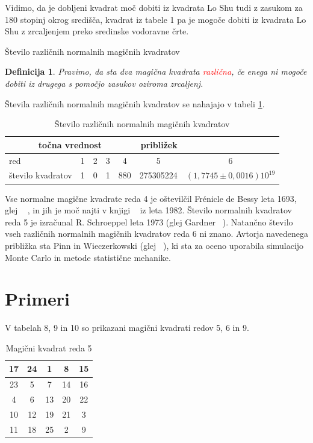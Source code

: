 \documentclass[a4paper,12pt]{article}
\newtheorem{definicija}[izrek]{Definicija}
\begin{document}
Vidimo, da je dobljeni kvadrat moč dobiti iz kvadrata Lo Shu tudi z zasukom za
180 stopinj okrog središča, kvadrat iz tabele 1 pa je mogoče dobiti
iz kvadrata Lo Shu z zrcaljenjem preko sredinske vodoravne črte.

Število različnih normalnih magičnih kvadratov

\begin{definicija}
      Pravimo, da sta dva magična kvadrata \textcolor{red}{\emph{različna}}, če enega ni mogoče dobiti
      iz drugega s pomočjo zasukov oziroma zrcaljenj.
\end{definicija}

Števila različnih normalnih magičnih kvadratov se nahajajo v tabeli \ref{table:stevila}.


\begin{table}[h]
   \centering
   \caption{Število različnih normalnih magičnih kvadratov}
   \begin{tabular}{lcccccc}
   \toprule
   \multicolumn{5}{c}{točna vrednost} & \multicolumn{1}{r}{približek} \\ 
   \midrule
   red & 1 & 2 & 3 & 4 & 5 & 6 \\
   \midrule
   število kvadratov & 1  & 0  & 1  & 880  & 275305224  & $(1,7745 \pm 0,0016)10^{19}$ \\ 
   \bottomrule
   \end{tabular}
   \label{table:stevila}
\end{table}

Vse normalne magične kvadrate reda 4 je oštevilčil Frénicle de Bessy
leta 1693, glej ~\cite{bessy} , in jih je moč najti v knjigi ~\cite{berlekamp}
iz leta 1982. Število normalnih kvadratov reda 5 je izračunal
R. Schroeppel leta 1973 (glej Gardner ~\cite{gardner}).
Natančno število vseh različnih normalnih magičnih kvadratov reda 6 ni znano.
Avtorja navedenega približka sta Pinn in Wieczerkowski (glej ~\cite{pinn}), ki
sta za oceno uporabila simulacijo Monte Carlo in metode statistične mehanike.


\section{Primeri}

V tabelah 8, 9 in 10 so prikazani
magični kvadrati redov 5, 6 in 9.

\begin{table}
   \centering
   \large
   \caption{Magični kvadrat reda 5}
   \begin{tabular}{|c|c|c|c|c|}
      \hline
      17 & 24 &  1 &  8 & 15 \\\hline
      23 &  5 &  7 & 14 & 16 \\\hline
      4 &  6 & 13 & 20 & 22 \\\hline
      10 & 12 & 19 & 21 &  3 \\\hline
      11 & 18 & 25 &  2 &  9 \\\hline
   \end{tabular}
   \label{table:mag5}
\end{table}
\end{document}
